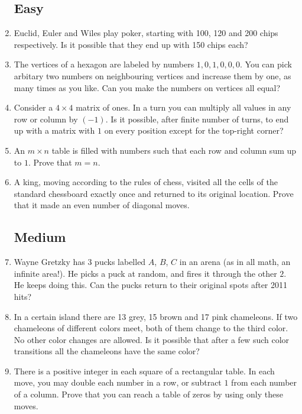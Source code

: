 \documentclass[11pt,a5paper]{article}
\begin{document}
\begin{enumerate}
	\subsection*{Easy}
	\item{Euclid, Euler and Wiles play poker, starting with 100, 120 and 200 chips respectively. Is it possible that they end up with 150 chips each?}

	\item{The vertices of a hexagon are labeled by numbers $1, 0, 1, 0, 0, 0$. You can pick arbitary two numbers on neighbouring vertices and increase them by one, as many times as you like. Can you make the numbers on vertices all equal?}
	
	\item{Consider a $4\times 4$ matrix of ones. In a turn you can  multiply all values in any row or column by $(-1)$. Is it possible, after finite number of turns, to end up with a matrix with $1$ on every position except for the top-right corner?}
	
	\item{An $m\times n$ table is filled with numbers such that each row and column sum up to $1$. Prove
that $m = n$.}

	\item{A king, moving according to the rules of chess, visited all the cells of the standard chessboard exactly once and returned to its original location. Prove that it made an even number of diagonal moves.}

	\subsection*{Medium}
	
	\item{Wayne Gretzky has 3 pucks labelled $A$, $B$, $C$ in an arena (as in all math, an infinite area!). He picks a puck at random, and fires it through the other $2$. He keeps doing this. Can the pucks return to their original spots after 2011 hits?}
	
	\item{In a certain island there are 13 grey, 15 brown and 17 pink chameleons. If two chameleons of different colors meet, both of them change to the third color. No other color changes are allowed. Is it possible that after a few such color transitions all the chameleons have the same color?}
	
	\item{There is a positive integer in each square of a rectangular table. In each move, you may double each number in a row, or subtract $1$ from each number of a column. Prove that you can reach a table of zeros by using only these moves.}
	

\end{enumerate}
\end{document}
